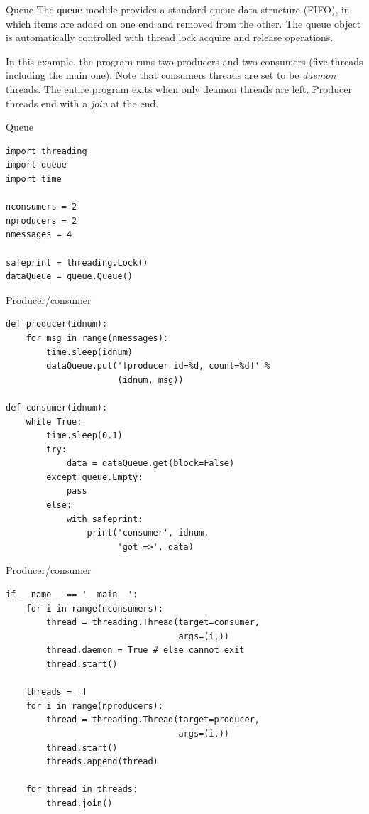 \documentclass[xcolor=dvipsnames, 10pt, presentation,aspectratio=169]{beamer}
\begin{document}
\begin{frame}[label={sec:orged5c2fd},fragile]{Queue}
 The \texttt{queue} module provides a standard queue data structure (FIFO),
in which items are added on one end and removed from the other.
The queue object is automatically controlled with thread lock acquire
and release operations.

In this example, the program runs two producers and two consumers
(five threads including the main one). Note that consumers threads are
set to be \emph{daemon} threads. The entire program exits when only deamon
threads are left. Producer threads end with a \emph{join} at the end.
\end{frame}
\begin{frame}[label={sec:orgc912d80},fragile]{Queue}
 \lstset{language=Python,label= ,caption= ,captionpos=b,numbers=none}
\begin{lstlisting}
import threading
import queue
import time

nconsumers = 2
nproducers = 2
nmessages = 4

safeprint = threading.Lock()
dataQueue = queue.Queue()
\end{lstlisting}
\end{frame}
\begin{frame}[label={sec:orgc281341},fragile]{Producer/consumer}
 \lstset{language=Python,label= ,caption= ,captionpos=b,numbers=none}
\begin{lstlisting}
def producer(idnum):
    for msg in range(nmessages):
        time.sleep(idnum)
        dataQueue.put('[producer id=%d, count=%d]' % 
                      (idnum, msg))

def consumer(idnum):
    while True:
        time.sleep(0.1)
        try:
            data = dataQueue.get(block=False)
        except queue.Empty:
            pass
        else:
            with safeprint:
                print('consumer', idnum,
                      'got =>', data)
\end{lstlisting}
\end{frame}
\begin{frame}[label={sec:org7276104},fragile]{Producer/consumer}
 \lstset{language=Python,label= ,caption= ,captionpos=b,numbers=none}
\begin{lstlisting}
if __name__ == '__main__':
    for i in range(nconsumers):
        thread = threading.Thread(target=consumer,
                                  args=(i,))
        thread.daemon = True # else cannot exit
        thread.start()

    threads = []        
    for i in range(nproducers):
        thread = threading.Thread(target=producer,
                                  args=(i,))
        thread.start()
        threads.append(thread)

    for thread in threads:
        thread.join()
\end{lstlisting}
\end{frame}
\end{document}
